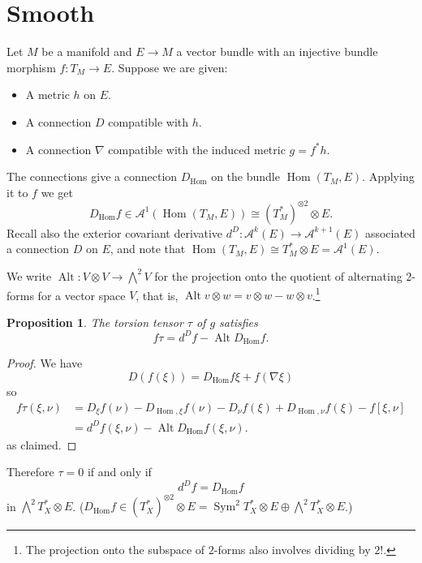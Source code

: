 \documentclass[12pt]{amsart}
\newtheorem{prop}[theo]{Proposition}
\theoremstyle{definition}
\newcommand{\cc}[1]{\mathcal{#1}}
\DeclareMathOperator{\Alt}{Alt}
\DeclareMathOperator{\Hom}{Hom}
\begin{document}
\section{Smooth}

Let $M$ be a manifold and $E \to M$ a vector bundle with an injective bundle morphism $f : T_M \to E$.
Suppose we are given:
\begin{itemize}
\item
A metric $h$ on $E$.

\item
A connection $D$ compatible with $h$.

\item
A connection $\nabla$ compatible with the induced metric $g = f^*h$.
\end{itemize}
The connections give a connection $D_{\Hom}$ on the bundle $\Hom(T_M, E)$.
Applying it to $f$ we get
\[
D_{\Hom}f
\in \cc A^1(\Hom(T_M, E))
\cong (T_M^*)^{\otimes 2} \otimes E.
\]
Recall also the exterior covariant derivative $d^D : \cc A^k(E) \to \cc A^{k+1}(E)$ associated a connection $D$ on $E$, and note that $\Hom(T_M, E) \cong T_M^* \otimes E = \cc A^1(E)$.

We write $\Alt : V \otimes V \to \bigwedge^2 V$ for the projection onto the quotient of alternating $2$-forms for a vector space $V$, that is, $\Alt v \otimes w = v \otimes w - w \otimes v$.\footnote{The projection onto the subspace of $2$-forms also involves dividing by $2!$.}


\begin{prop}
The torsion tensor $\tau$ of $g$ satisfies
\[
f \tau
= d^D f
- \Alt D_{\Hom}f.
\]
\end{prop}

\begin{proof}
We have
\[
D(f(\xi))
= D_{\Hom}f \xi + f(\nabla \xi)
\]
so
\begin{align*}
f \tau(\xi,\nu)
&= D_\xi f(\nu) 
- D_{\Hom,\xi} f(\nu)
- D_\nu f(\xi) 
+ D_{\Hom,\nu} f(\xi)
- f [\xi, \nu]
\\
&= 
d^D f(\xi, \nu)
- \Alt D_{\Hom}f (\xi, \nu).
\end{align*}
as claimed.
\end{proof}

Therefore $\tau = 0$ if and only if
\[
d^D f = D_{\Hom} f
\]
in $\bigwedge^2 T_X^* \otimes E$.
($D_{\Hom}f \in (T_X^*)^{\otimes 2} \otimes E = \operatorname{Sym}^2 T_X^* \otimes E \oplus \bigwedge^2 T_X^* \otimes E$.)
\end{document}
